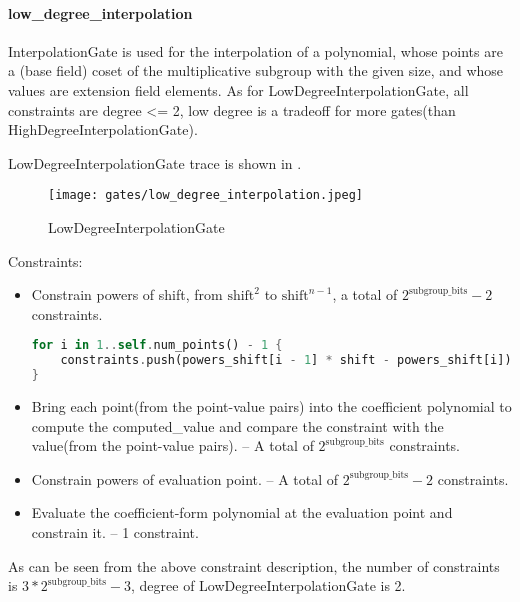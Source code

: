 \paragraph{low\_degree\_interpolation}

InterpolationGate is used for the interpolation of a polynomial, whose points are a (base field) coset of the multiplicative subgroup 
with the given size, and whose values are extension field elements. As for LowDegreeInterpolationGate,  all constraints are degree <= 2, 
low degree is a tradeoff for more gates(than HighDegreeInterpolationGate).

LowDegreeInterpolationGate trace is shown in .

\begin{figure}[!ht]
    \centering
    \texttt{[image: gates/low\_degree\_interpolation.jpeg]}
    \caption{LowDegreeInterpolationGate}
    \label{fig:low-degree-interpolation}
\end{figure}

Constraints:
\begin{itemize}
    \item Constrain powers of shift, from $\text{shift}^2$ to $\text{shift}^{n-1}$, a total of $2^{\text{subgroup\_bits}}-2$ constraints.
    \begin{lstlisting}[language=rust]
for i in 1..self.num_points() - 1 {
    constraints.push(powers_shift[i - 1] * shift - powers_shift[i]);
}
    \end{lstlisting}
    \item Bring each point(from the point-value pairs) into the coefficient polynomial to compute the computed\_value 
    and compare the constraint with the value(from the point-value pairs). -- A total of $2^{\text{subgroup\_bits}}$ constraints.
    \item Constrain powers of evaluation point. -- A total of $2^{\text{subgroup\_bits}}-2$ constraints.
    \item Evaluate the coefficient-form polynomial at the evaluation point and constrain it. -- 1 constraint.
\end{itemize}

As can be seen from the above constraint description, the number of constraints is $3*2^{\text{subgroup\_bits}}-3$, degree of LowDegreeInterpolationGate is 2.
